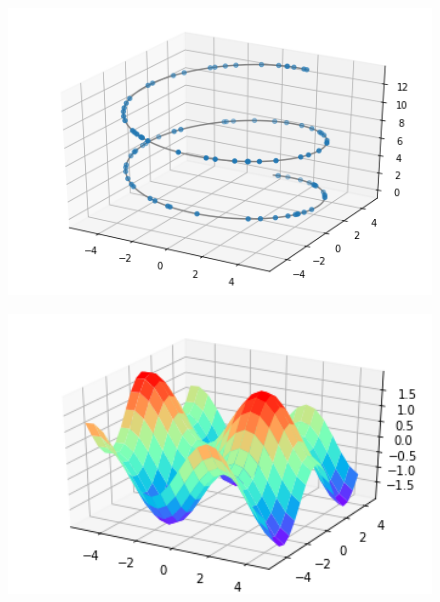 \documentclass[a4paper,12pt]{ctexart} %
\begin{document}
    \begin{figure}[H]
        \centering
        \begin{minipage}[c]{0.3\textwidth}
            \centering
            \includegraphics[width=1.05\textwidth]{figtwo.png}
            \label{fig:sample-figure-a}
        \end{minipage}
        \begin{minipage}[c]{0.3\textwidth}
            \centering
            \includegraphics[width=1.05\textwidth]{figthree.png}
            \label{fig:sample-figure-b}
        \end{minipage}
        \begin{minipage}[c]{0.3\textwidth}
            \centering

\end{minipage}
\end{figure}
\end{document}

